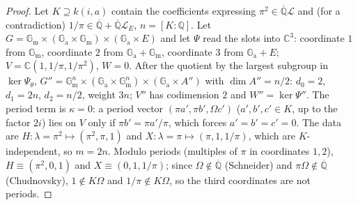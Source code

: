 \documentclass[11pt]{amsart}
\theoremstyle{definition}
\newcommand{\Qb}{\overline{\mathbb{Q}}}
\newcommand{\C}{\mathbb{C}}
\newcommand{\Q}{\mathbb{Q}}
\newcommand{\Ga}{\mathbb{G}_{\mathrm a}}
\newcommand{\Gm}{\mathbb{G}_{\mathrm m}}
\newcommand{\Lg}{\mathcal{L}}
\begin{document}
\begin{proof}
Let $K\supseteq k(i,a)$ contain the coefficients expressing $\pi^2\in\Qb\Lg$ and (for a contradiction) $1/\pi\in\Qb+\Qb\Lg_E$,
$n=[K:\Q]$. Let $G=\Gm\times(\Ga\times\Gm)\times(\Ga\times E)$ and let $\Psi$ read the slots into $\C^3$: coordinate $1$ from
$\Gm$, coordinate $2$ from $\Ga+\Gm$, coordinate $3$ from $\Ga+E$; $V=\C(1,1/\pi,1/\pi^2)$, $W=0$. After the quotient by the
largest subgroup in $\ker\Psi_\theta$, $G''=\Gm^n\times(\Ga\times\Gm^n)\times(\Ga\times A'')$ with $\dim A''=n/2$: $d_0=2$,
$d_1=2n$, $d_2=n/2$, weight $3n$; $V''$ has codimension $2$ and $W''=\ker\Psi''$. The period term is $\kappa=0$: a period vector
$(\pi a',\pi b',\Omega c')$ ($a',b',c'\in K$, up to the factor $2i$) lies on $V$ only if $\pi b'=\pi a'/\pi$, which forces
$a'=b'=c'=0$. The data are $H\colon\lambda=\pi^2\mapsto(\pi^2,\pi,1)$ and $X\colon\lambda=\pi\mapsto(\pi,1,1/\pi)$, which are
$K$-independent, so $m=2n$. Modulo periods (multiples of $\pi$ in coordinates $1,2$), $H\equiv(\pi^2,0,1)$ and $X\equiv(0,1,1/\pi)$;
since $\Omega\notin\Qb$ (Schneider) and $\pi\Omega\notin\Qb$ (Chudnovsky), $1\notin K\Omega$ and $1/\pi\notin K\Omega$, so the third
coordinates are not periods.


\end{proof}
\end{document}

